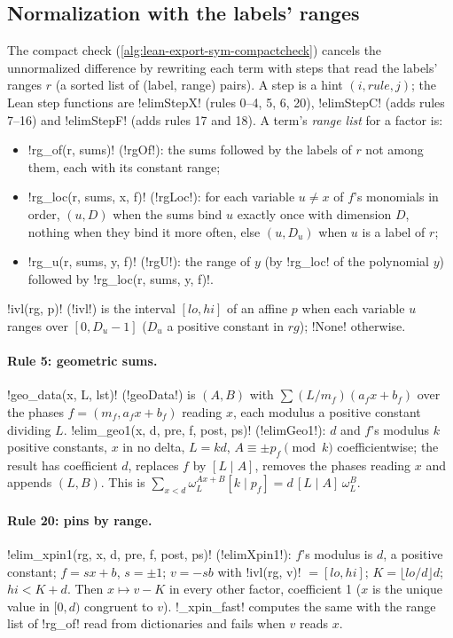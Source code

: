 {{{\subsection{Normalization with the labels' ranges}\label{sec:lean-export-sym-rx}

The compact check (\cref{alg:lean-export-sym-compactcheck}) cancels the unnormalized difference
by rewriting each term with steps that read the labels' ranges $r$ (a sorted list of (label,
range) pairs). A step is a hint $(i, \mathit{rule}, j)$; the Lean step functions are
\lexlean!elimStepX! (rules 0--4, 5, 6, 20), \lexlean!elimStepC! (adds rules 7--16) and
\lexlean!elimStepF! (adds rules 17 and 18). A term's \emph{range list} for a factor is:
\begin{itemize}
\item \lexpy!rg_of(r, sums)! (\lexlean!rgOf!): the sums followed by the labels of $r$ not among them,
each with its constant range;
\item \lexpy!rg_loc(r, sums, x, f)! (\lexlean!rgLoc!): for each variable $u\ne x$ of $f$'s monomials in
order, $(u, D)$ when the sums bind $u$ exactly once with dimension $D$, nothing when they bind
it more often, else $(u, D_u)$ when $u$ is a label of $r$;
\item \lexpy!rg_u(r, sums, y, f)! (\lexlean!rgU!): the range of $y$ (by \lexpy!rg_loc! of the polynomial
$y$) followed by \lexpy!rg_loc(r, sums, y, f)!.
\end{itemize}
\lexpy!ivl(rg, p)! (\lexlean!ivl!) is the interval $[lo, hi]$ of an affine $p$ when each variable $u$
ranges over $[0, D_u-1]$ ($D_u$ a positive constant in $rg$); \lexpy!None! otherwise.

\paragraph{Rule 5: geometric sums.} \lexpy!geo_data(x, L, lst)! (\lexlean!geoData!) is $(A, B)$ with
$\sum (L/m_f)(a_f x + b_f)$ over the phases $f=(m_f, a_fx+b_f)$ reading $x$, each modulus a
positive constant dividing $L$. \lexpy!elim_geo1(x, d, pre, f, post, ps)! (\lexlean!elimGeo1!): $d$
and $f$'s modulus $k$ positive constants, $x$ in no delta, $L = kd$, $A \equiv \pm p_f \pmod k$
coefficientwise; the result has coefficient $d$, replaces $f$ by $[L \mid A]$, removes the
phases reading $x$ and appends $(L, B)$. This is
$\sum_{x<d}\omega_L^{Ax+B}[k\mid p_f] = d\,[L\mid A]\,\omega_L^{B}$.

\paragraph{Rule 20: pins by range.} \lexpy!elim_xpin1(rg, x, d, pre, f, post, ps)!
(\lexlean!elimXpin1!): $f$'s modulus is $d$, a positive constant; $f = sx + b$, $s = \pm1$;
$v = -sb$ with \lexpy!ivl(rg, v)! $=[lo, hi]$; $K = \lfloor lo/d\rfloor d$; $hi < K + d$. Then
$x \mapsto v - K$ in every other factor, coefficient 1 ($x$ is the unique value in $[0, d)$
congruent to $v$). \lexpy!_xpin_fast! computes the same with the range list of \lexpy!rg_of! read
from dictionaries and fails when $v$ reads $x$.

}}}

